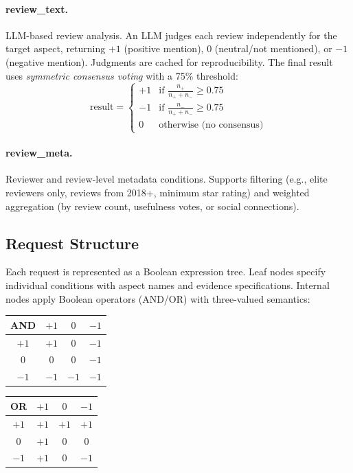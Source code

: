 \paragraph{review\_text.}
LLM-based review analysis.
An LLM judges each review independently for the target aspect, returning $+1$ (positive mention), $0$ (neutral/not mentioned), or $-1$ (negative mention).
Judgments are cached for reproducibility.
The final result uses \emph{symmetric consensus voting} with a 75\% threshold:
\begin{equation}
    \text{result} = \begin{cases}
        +1 & \text{if } \frac{n_+}{n_+ + n_-} \geq 0.75 \\
        -1 & \text{if } \frac{n_-}{n_+ + n_-} \geq 0.75 \\
        0  & \text{otherwise (no consensus)}
    \end{cases}
\end{equation}

\paragraph{review\_meta.}
Reviewer and review-level metadata conditions.
Supports filtering (e.g., elite reviewers only, reviews from 2018+, minimum star rating) and weighted aggregation (by review count, usefulness votes, or social connections).

\subsection{Request Structure}

Each request is represented as a Boolean expression tree.
Leaf nodes specify individual conditions with aspect names and evidence specifications.
Internal nodes apply Boolean operators (AND/OR) with three-valued semantics:

\begin{center}
\begin{tabular}{c|ccc}
AND & $+1$ & $0$ & $-1$ \\
\hline
$+1$ & $+1$ & $0$ & $-1$ \\
$0$  & $0$  & $0$ & $-1$ \\
$-1$ & $-1$ & $-1$ & $-1$
\end{tabular}
\quad
\begin{tabular}{c|ccc}
OR & $+1$ & $0$ & $-1$ \\
\hline
$+1$ & $+1$ & $+1$ & $+1$ \\
$0$  & $+1$ & $0$  & $0$ \\
$-1$ & $+1$ & $0$  & $-1$
\end{tabular}
\end{center}

